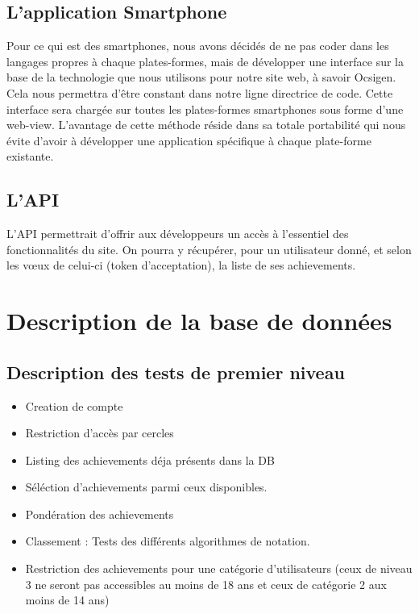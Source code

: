 \documentclass{life-fr}
\begin{document}
\section{L'application Smartphone}
Pour ce qui est des smartphones, nous avons décidés de ne pas coder dans les langages propres à chaque plates-formes, mais de développer une interface sur la base de la technologie que nous utilisons pour notre site web, à savoir Ocsigen. Cela nous permettra d'être constant dans notre ligne directrice de code. Cette interface sera chargée sur toutes les plates-formes smartphones sous forme d'une web-view. L'avantage de cette méthode réside dans sa totale portabilité qui nous évite d'avoir à développer une application spécifique à chaque plate-forme existante.

\section{L'API}

L'API permettrait d'offrir aux développeurs un accès à l'essentiel des fonctionnalités du site. On pourra y récupérer, pour un utilisateur donné, et selon les vœux de celui-ci (token d'acceptation), la liste de ses achievements.


\chapter{Description de la base de données}

\section{Description des tests de premier niveau}

\begin{itemize}
  \item{Creation de compte}
  \item {Restriction d’accès par cercles}
  \item Listing des achievements déja présents dans la DB
  \item Séléction d’achievements parmi ceux disponibles.
  \item Pondération des achievements
  \item Classement : Tests des différents algorithmes de notation.
  \item Restriction des achievements pour une catégorie d’utilisateurs (ceux de niveau 3 ne seront pas accessibles au moins de 18 ans et ceux de catégorie 2 aux moins de 14 ans)
\end{itemize}
\end{document}
